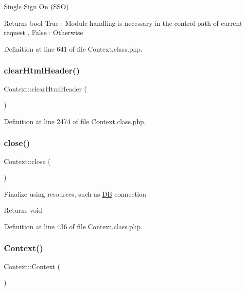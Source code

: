 Single Sign On (S\+SO)

\begin{DoxyReturn}{Returns}
bool True \+: Module handling is necessary in the control path of current request , False \+: Otherwise 
\end{DoxyReturn}


Definition at line 641 of file Context.\+class.\+php.

\mbox{\label{classContext_a5f0332b30b4ad65c0374ebd848c1dd98}} 
\subsubsection{\texorpdfstring{clear\+Html\+Header()}{clearHtmlHeader()}}
{\footnotesize\ttfamily Context\+::clear\+Html\+Header (\begin{DoxyParamCaption}{ }\end{DoxyParamCaption})}



Definition at line 2474 of file Context.\+class.\+php.

\mbox{\label{classContext_ad59031e45d21ad27eb7d06e0ee76f008}} 
\subsubsection{\texorpdfstring{close()}{close()}}
{\footnotesize\ttfamily Context\+::close (\begin{DoxyParamCaption}{ }\end{DoxyParamCaption})}

Finalize using resources, such as \hyperlink{classDB}{DB} connection

\begin{DoxyReturn}{Returns}
void 
\end{DoxyReturn}


Definition at line 436 of file Context.\+class.\+php.

\mbox{\label{classContext_a652cdcd2eedc8dbd9110bd284c5d5cf0}} 
\subsubsection{\texorpdfstring{Context()}{Context()}}
{\footnotesize\ttfamily Context\+::\+Context (\begin{DoxyParamCaption}{ }\end{DoxyParamCaption})}


